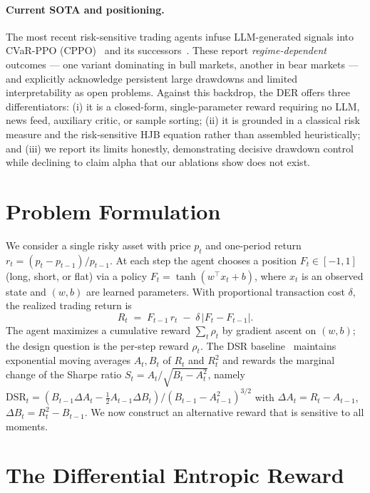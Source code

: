 \documentclass[11pt]{article}
\theoremstyle{definition}
\newcommand{\DSR}{\mathrm{DSR}}
\begin{document}
\paragraph{Current SOTA and positioning.} The most recent risk-sensitive trading agents
infuse LLM-generated signals into CVaR-PPO (CPPO)~\cite{benhenda2025} and its
successors~\cite{dapo2025}. These report \emph{regime-dependent} outcomes --- one
variant dominating in bull markets, another in bear markets --- and explicitly
acknowledge persistent large drawdowns and limited interpretability as open problems.
Against this backdrop, the DER offers three differentiators: (i) it is a closed-form,
single-parameter reward requiring no LLM, news feed, auxiliary critic, or sample
sorting; (ii) it is grounded in a classical risk measure and the risk-sensitive HJB
equation rather than assembled heuristically; and (iii) we report its limits honestly,
demonstrating decisive drawdown control while declining to claim alpha that our
ablations show does not exist.

\section{Problem Formulation}\label{sec:formulation}

We consider a single risky asset with price $p_t$ and one-period return
$r_t=(p_t-p_{t-1})/p_{t-1}$. At each step the agent chooses a position
$F_t\in[-1,1]$ (long, short, or flat) via a policy $F_t=\tanh(w^\top x_t+b)$, where
$x_t$ is an observed state and $(w,b)$ are learned parameters. With proportional
transaction cost $\delta$, the realized trading return is
\begin{equation}
R_t \;=\; F_{t-1}\,r_t \;-\; \delta\,\lvert F_t-F_{t-1}\rvert .
\label{eq:Rt}
\end{equation}
The agent maximizes a cumulative reward $\sum_t \rho_t$ by gradient ascent on
$(w,b)$; the design question is the per-step reward $\rho_t$. The DSR
baseline~\cite{moody2001} maintains exponential moving averages $A_t,B_t$ of $R_t$
and $R_t^2$ and rewards the marginal change of the Sharpe ratio
$S_t=A_t/\sqrt{B_t-A_t^2}$, namely
$\DSR_t=(B_{t-1}\Delta A_t-\tfrac12A_{t-1}\Delta B_t)/(B_{t-1}-A_{t-1}^2)^{3/2}$
with $\Delta A_t=R_t-A_{t-1}$, $\Delta B_t=R_t^2-B_{t-1}$. We now construct an
alternative reward that is sensitive to all moments.

\section{The Differential Entropic Reward}\label{sec:der}
\end{document}
